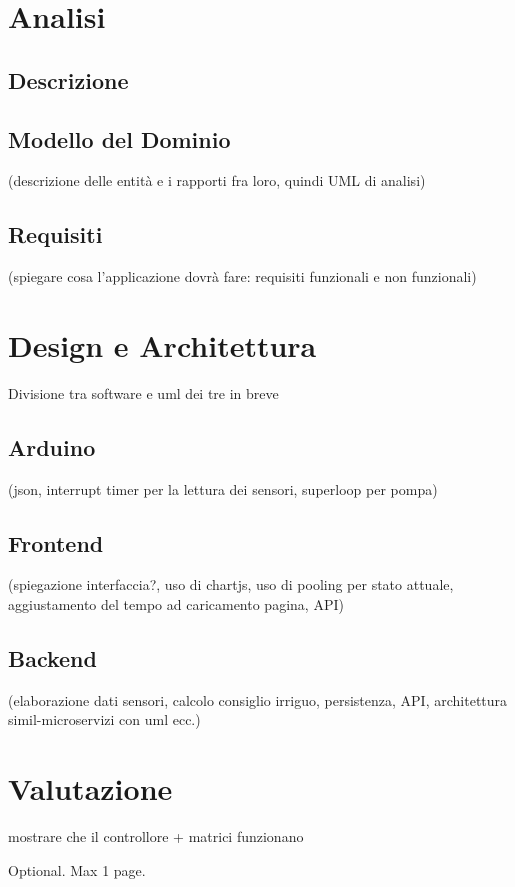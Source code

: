 \documentclass[12pt,a4paper,openright,twoside, openany, draft]{book}
\begin{document}
\section{Analisi}
    \subsection{Descrizione}
    \subsection{Modello del Dominio} (descrizione delle entità e i rapporti fra loro, quindi UML di analisi)
    \subsection{Requisiti} (spiegare cosa l'applicazione dovrà fare: requisiti funzionali e non funzionali)
\section{Design e Architettura}
    Divisione tra software e uml dei tre in breve
    \subsection{Arduino} (json, interrupt timer per la lettura dei sensori, superloop per pompa)
    \subsection{Frontend}
    (spiegazione interfaccia?, uso di chartjs, uso di pooling per stato attuale, aggiustamento del tempo ad caricamento pagina, API)
    \subsection{Backend}
    (elaborazione dati sensori, calcolo consiglio irriguo, persistenza, API, architettura simil-microservizi con uml ecc.)

\section{Valutazione}
    mostrare che il controllore + matrici funzionano



%
%

\backmatter


% 
% 


\begin{acknowledgements} %
    Optional. Max 1 page.
\end{acknowledgements}
\end{document}
